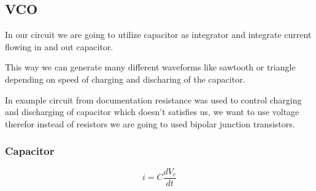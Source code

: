 \documentclass[english,10pt,a4paper]{article}
\begin{document}
	\subsection{VCO}
	In our circuit we are going to utilize capacitor as integrator and integrate current flowing in and out capacitor. %
	
	This way we can generate many different waveforms like sawtooth or triangle depending on speed of charging and discharing of the capacitor.
	
	In example circuit from documentation resistance was used to control charging and discharging of capacitor which doesn't satisfies us, we want to use voltage therefor instead of resistors we are going to used bipolar junction transistors.
	\subsubsection{Capacitor}
	
	\begin{equation}
		i = C \dfrac{dV_c}{dt}
	\end{equation}
	
		

	
	
	
\end{document}
